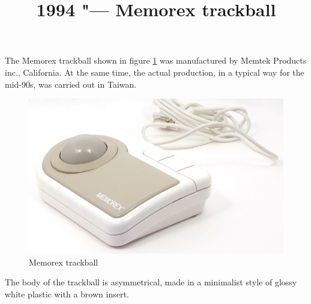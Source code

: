 \documentclass[11pt, a4paper]{article}
\begin{document}
\title{1994 "--- Memorex trackball}
\date{}
\maketitle

The Memorex trackball shown in figure \ref{fig:MemorexPic} was manufactured by Memtek Products inc., California. At the same time, the actual production, in a typical way for the mid-90s, was carried out in Taiwan.

\begin{figure}[h]
    \centering
    \includegraphics[scale=0.5]{1994_memorex_trackball/pic_30.jpg}
    \caption{Memorex trackball}
    \label{fig:MemorexPic}
\end{figure}

The body of the trackball is asymmetrical, made in a minimalist style of glossy white plastic with a brown insert.
\end{document}
